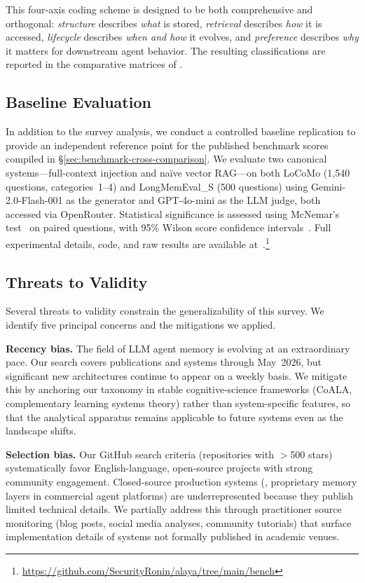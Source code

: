 This four-axis coding scheme is designed to be both comprehensive and
orthogonal: \emph{structure} describes \emph{what} is stored,
\emph{retrieval} describes \emph{how} it is accessed, \emph{lifecycle}
describes \emph{when and how} it evolves, and \emph{preference} describes
\emph{why} it matters for downstream agent behavior. The resulting
classifications are reported in the comparative matrices of
.

\subsection{Baseline Evaluation}
\label{sec:methodology-baseline}

In addition to the survey analysis, we conduct a controlled baseline
replication to provide an independent reference point for the published
benchmark scores compiled in \S\ref{sec:benchmark-cross-comparison}.  We
evaluate two canonical systems---full-context injection and na\"ive vector
RAG---on both LoCoMo (1{,}540 questions, categories~1--4) and LongMemEval\_S
(500 questions) using Gemini-2.0-Flash-001 as the generator and GPT-4o-mini as
the LLM judge, both accessed via OpenRouter.  Statistical significance is
assessed using McNemar's test~\cite{mcnemar1947} on paired questions, with
95\% Wilson score confidence intervals~\cite{wilson1927}.  Full experimental details, code, and raw results are
available at~\cite{alaya2026}.\footnote{\url{https://github.com/SecurityRonin/alaya/tree/main/bench}}

\subsection{Threats to Validity}
\label{sec:threats}

Several threats to validity constrain the generalizability of this survey.
We identify five principal concerns and the mitigations we applied.

\textbf{Recency bias.} The field of LLM agent memory is evolving at an
extraordinary pace. Our search covers publications and systems through
May~2026, but significant new architectures continue to appear on a
weekly basis. We mitigate this by anchoring our taxonomy in stable
cognitive-science frameworks (CoALA, complementary learning systems
theory) rather than system-specific features, so that the analytical
apparatus remains applicable to future systems even as the landscape
shifts.

\textbf{Selection bias.} Our GitHub search criteria (repositories with
$>$500 stars) systematically favor English-language, open-source projects
with strong community engagement. Closed-source production systems
(\eg, proprietary memory layers in commercial agent platforms) are
underrepresented because they publish limited technical details. We
partially address this through practitioner source monitoring (blog posts,
social media analyses, community tutorials) that surface implementation
details of systems not formally published in academic venues.

